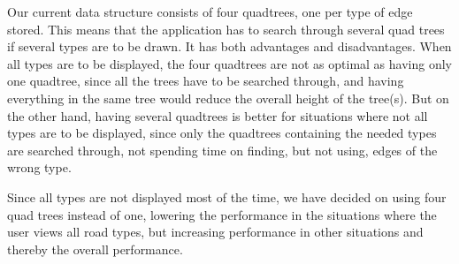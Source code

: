 Our current data structure consists of four quadtrees, one per type of edge stored. This means that the application has to search through several quad trees if several types are to be drawn. It has both advantages and disadvantages. When all types are to be displayed, the four quadtrees are not as optimal as having only one quadtree, since all the trees have to be searched through, and having everything in the same tree would reduce the overall height of the tree(s). But on the other hand, having several quadtrees is better for situations where not all types are to be displayed, since only the quadtrees containing the needed types are searched through, not spending time on finding, but not using, edges of the wrong type.

Since all types are not displayed most of the time, we have decided on using four quad trees instead of one, lowering the performance in the situations where the user views all road types, but increasing performance in other situations and thereby the overall performance.